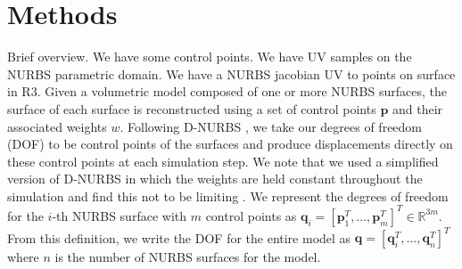 

\section{Methods}
Brief overview. We have some control points. We have UV samples on the NURBS parametric domain. We have a NURBS jacobian UV to points on surface in R3.
Given a volumetric model composed of one or more NURBS surfaces, the surface of each surface is reconstructed using a set of control points $\textbf{p}$ and their associated weights $w$. Following D-NURBS \cite{10.1145/176579.176580}, we take our degrees of freedom (DOF) to be control points of the surfaces and produce displacements directly on these control points at each simulation step. We note that we used a simplified version of D-NURBS in which the weights are held constant throughout the simulation and find this not to be limiting . We represent the degrees of freedom for the $i$-th NURBS surface with $m$ control points as $\mathbf{q}_i = \left[ \mathbf{p}_1^T, \dots, \mathbf{p}_m^T \right]^T \in \mathbb{R}^{3m}$. From this definition, we write the DOF for the entire model as $\mathbf{q} = \left[ \mathbf{q}_i^T, \dots, \mathbf{q}_n^T \right]^T$ where $n$ is the number of NURBS surfaces for the model. 

